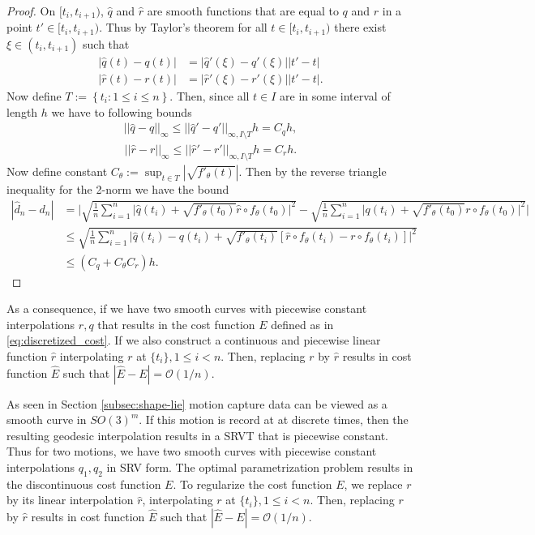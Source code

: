 \begin{proof}
  On  \([t_i, t_{i+1})\),  \(\hat q\) and  \(\hat r\) are smooth functions that are equal to  \(q\) and  \(r\) in a point  \(t' \in [t_i, t_{i+1})\). Thus by Taylor's theorem for all  \(t \in [t_i, t_{i+1})\) there exist  \(\xi \in (t_i, t_{i+1})\) such that
  \begin{align*}
    |\hat q(t) - q(t)| & = |\hat q'(\xi) - q'(\xi)||t' - t|  \\
    |\hat r(t) - r(t)| & = |\hat r'(\xi) - r'(\xi)||t' - t|.
  \end{align*}
  Now define  \(T:= \left \{t_i : 1 \leq i \leq n \right \} \). Then, since all  \(t \in I\) are in some interval of length  \(h\) we have to following bounds
  \begin{align*}
    ||\hat q - q||_{\infty} \leq ||\hat q' - q'||_{\infty, I \setminus T}h = C_q h,
  \end{align*}
  \begin{align*}
    ||\hat r - r||_{\infty} \leq ||\hat r' - r'||_{\infty, I \setminus T}h = C_r h.
  \end{align*}
  Now define constant  \(C_{\theta}:= \sup_{t\in T} | \sqrt{f'_\theta(t)} | \). Then by the reverse triangle inequality for the 2-norm we have the bound
  \begin{align*}
    |\hat d_n - d_n |
     & = \Bigg| \sqrt{\frac{1}{n}\sum_{i=1}^{n}\Big|\hat q(t_i) + \sqrt{f'_{\theta}(t_0)} \hat r \circ f_{\theta}(t_0)\Big|^2}-\sqrt{\frac{1}{n}\sum_{i=1}^{n}\Big|q(t_i) + \sqrt{f'_{\theta}(t_0)} r \circ f_{\theta}(t_0)\Big|^2 } \Bigg| \\
     & \leq \sqrt{\frac{1}{n}\sum_{i=1}^{n}\Big|\hat q(t_i) - q(t_i)  + \sqrt{f'_{\theta}(t_i)}\left[  \hat r \circ f_{\theta}(t_i) - r \circ f_{\theta}(t_i)\right]\Big|^2}                                                                \\
     & \leq \left(C_q  + C_{\theta} C_r \right)h.
  \end{align*}
\end{proof}

As a consequence, if we have two smooth curves with piecewise constant interpolations \(r, q\) that results in the cost function \(E\) defined as in \eqref{eq:discretized_cost}. If we also construct a continuous and piecewise linear function \(\hat r\) interpolating \(r\) at \(\{t_i\}, 1 \leq i <n\). Then, replacing \(r\) by \(\hat r\) results in cost function  \(\hat{E}\) such that \(|\hat{E} - E |= \mathcal{O}(1/n)\).

As seen in Section \ref{subsec:shape-lie} motion capture data can be viewed as a smooth curve in \({SO(3)}^m\). If this motion is record at at discrete times, then the resulting geodesic interpolation results in a SRVT that is piecewise constant. Thus for two motions, we have two smooth curves with piecewise constant interpolations \(q_1, q_2\) in SRV form. The optimal parametrization problem results in the discontinuous cost function \(E\). To regularize the cost function \(E\), we replace \(r\) by its linear interpolation \(\hat r\), interpolating \(r\) at \(\{t_i\}, 1 \leq i <n\). Then, replacing \(r\) by \(\hat r\) results in cost function  \(\hat{E}\) such that \(|\hat{E} - E |= \mathcal{O}(1/n)\). 
